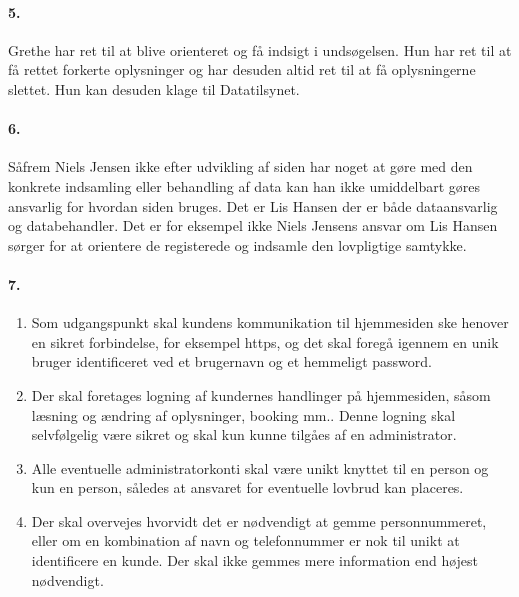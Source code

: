 \paragraph{5.} Grethe har ret til at blive orienteret og få indsigt i
undsøgelsen. Hun har ret til at få rettet forkerte oplysninger og har desuden
altid ret til at få oplysningerne slettet. Hun kan desuden klage til
Datatilsynet.

\paragraph{6.}
Såfrem Niels Jensen ikke efter udvikling af siden har noget at gøre med den
konkrete indsamling eller behandling af data kan han ikke umiddelbart gøres
ansvarlig for hvordan siden bruges. Det er Lis Hansen der er både dataansvarlig og
databehandler. Det er for eksempel ikke Niels Jensens ansvar om Lis Hansen
sørger for at orientere de registerede og indsamle den lovpligtige samtykke.

\paragraph{7.}
\begin{enumerate}
\item Som udgangspunkt skal kundens kommunikation til hjemmesiden ske henover en
sikret forbindelse, for eksempel https, og det skal foregå igennem en unik
bruger identificeret ved et brugernavn og et hemmeligt password.
\item Der skal foretages logning af kundernes handlinger på hjemmesiden, såsom
læsning og ændring af oplysninger, booking mm.. Denne logning skal selvfølgelig
være sikret og skal kun kunne tilgåes af en administrator.
\item Alle eventuelle administratorkonti skal være unikt knyttet til en person
og kun en person, således at ansvaret for eventuelle lovbrud kan placeres.
\item Der skal overvejes hvorvidt det er nødvendigt at gemme personnummeret,
eller om en kombination af navn og telefonnummer er nok til unikt at identificere
en kunde. Der skal ikke gemmes mere information end højest nødvendigt.
\end{enumerate}

